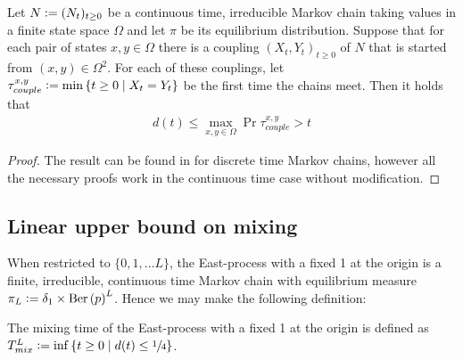 


\begin{theorem}\label{thm:equilibrium_distance}
Let $N \vcentcolon= (N_t)_{t \geq 0}$ be a continuous time, irreducible Markov chain taking values in a finite state space $\Omega$ and let $\pi$ be its equilibrium distribution. Suppose that for each pair of states $x,y \in \Omega$ there is a coupling $(X_t, Y_t)_{t \geq 0}$ of $N$ that is started from $(x,y) \in \Omega^2$. For each of these couplings, let $\tau^{x, y}_{couple} \vcentcolon= \min\left\{t \geq 0 \mid X_t = Y_t \right\}$ be the first time the chains meet. Then it holds that 
\begin{align}
d(t) \leq \max\limits_{x,y \in \Omega} \Pr{\tau^{x, y}_{couple} > t}
\end{align}
\end{theorem}

\begin{proof}
The result can be found in \cite[Corollary 5.3]{levin2017markov} for discrete time Markov chains, however all the necessary proofs work in the continuous time case without modification. 
\end{proof}

\subsection{Linear upper bound on mixing}

When restricted to $\{0, 1, ... L\}$, the East-process with a fixed 1 at the origin is a finite, irreducible, continuous time Markov chain with equilibrium measure $\pi_L \vcentcolon= \delta_{1} \times \text{Ber} \left( p \right)^L$. Hence we may make the following definition:
\begin{definition}
 The mixing time of the East-process with a fixed 1 at the origin is defined as $T^L_{mix} \vcentcolon= \inf\left\{ t \geq 0 \mid d(t) \leq \sfrac{1}{4} \right\}$. 
\end{definition}

